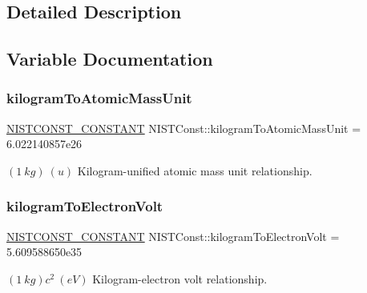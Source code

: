 \subsection{Detailed Description}


\subsection{Variable Documentation}
\mbox{\label{group___n_i_s_t_const-_kilogram_ga35f254bf103cee35787785371c8c87b9}} 
\subsubsection{\texorpdfstring{kilogram\+To\+Atomic\+Mass\+Unit}{kilogramToAtomicMassUnit}}
{\footnotesize\ttfamily \mbox{\hyperlink{group___n_i_s_t_const-_macros_ga2b0fc1d7452373f816175dd86ce26729}{N\+I\+S\+T\+C\+O\+N\+S\+T\+\_\+\+C\+O\+N\+S\+T\+A\+NT}} N\+I\+S\+T\+Const\+::kilogram\+To\+Atomic\+Mass\+Unit = 6.\+022140857e26}

$(1\ kg)\ (u)$ Kilogram-\/unified atomic mass unit relationship. \mbox{\label{group___n_i_s_t_const-_kilogram_gaf4c85de736c542b75e716d4331d7f324}} 
\subsubsection{\texorpdfstring{kilogram\+To\+Electron\+Volt}{kilogramToElectronVolt}}
{\footnotesize\ttfamily \mbox{\hyperlink{group___n_i_s_t_const-_macros_ga2b0fc1d7452373f816175dd86ce26729}{N\+I\+S\+T\+C\+O\+N\+S\+T\+\_\+\+C\+O\+N\+S\+T\+A\+NT}} N\+I\+S\+T\+Const\+::kilogram\+To\+Electron\+Volt = 5.\+609588650e35}

$(1\ kg)c^2 \ (eV)$ Kilogram-\/electron volt relationship. \mbox{\label{group___n_i_s_t_const-_kilogram_ga86871a9bebdacc0ba4cc0cb499f6bdde}} 
